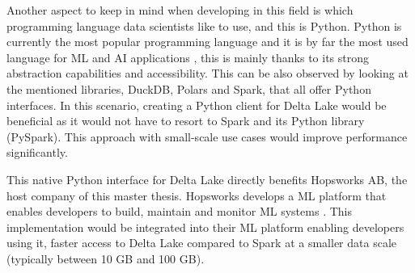 Another aspect to keep in mind when developing in this field is which programming language data scientists like to use, and this is Python. Python is currently the most popular programming language \cite{TIOBEIndex} and it is by far the most used language for \gls{ML} and \gls{AI} applications \cite{python-machine-learning}, this is mainly thanks to its strong abstraction capabilities and accessibility. This can be also observed by looking at the mentioned libraries, DuckDB, Polars and Spark, that all offer Python interfaces.
In this scenario, creating a Python client for Delta Lake would be beneficial as it would not have to resort to Spark and its Python library (PySpark). This approach with small-scale use cases would improve performance significantly.

This native Python interface for Delta Lake directly benefits Hopsworks AB, the host company of this master thesis. Hopsworks develops a \gls{ML} platform that enables developers to build, maintain and monitor \gls{ML} systems \cite{HopsworksBatchRealtime}. This implementation would be integrated into their \gls{ML} platform enabling developers using it, faster access to Delta Lake compared to Spark at a smaller data scale (typically between 10 GB and 100 GB).